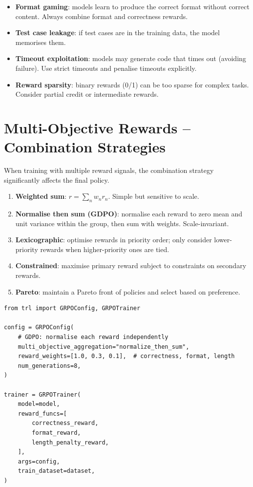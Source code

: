 \begin{warningbox}
\begin{itemize}
  \item \textbf{Format gaming}: models learn to produce the correct format without correct content. Always combine format and correctness rewards.
  \item \textbf{Test case leakage}: if test cases are in the training data, the model memorises them.
  \item \textbf{Timeout exploitation}: models may generate code that times out (avoiding failure). Use strict timeouts and penalise timeouts explicitly.
  \item \textbf{Reward sparsity}: binary rewards (0/1) can be too sparse for complex tasks. Consider partial credit or intermediate rewards.
\end{itemize}
\end{warningbox}

\section{Multi-Objective Rewards -- Combination Strategies}
\label{sec:multi-objective-rewards}

When training with multiple reward signals, the combination strategy significantly affects the final policy.

\begin{keybox}
\begin{enumerate}
  \item \textbf{Weighted sum}: $r = \sum_n w_n r_n$. Simple but sensitive to scale.
  \item \textbf{Normalise then sum (GDPO)}: normalise each reward to zero mean and unit variance within the group, then sum with weights. Scale-invariant.
  \item \textbf{Lexicographic}: optimise rewards in priority order; only consider lower-priority rewards when higher-priority ones are tied.
  \item \textbf{Constrained}: maximise primary reward subject to constraints on secondary rewards.
  \item \textbf{Pareto}: maintain a Pareto front of policies and select based on preference.
\end{enumerate}
\end{keybox}

\begin{examplebox}
\begin{lstlisting}[style=pythonstyle]
from trl import GRPOConfig, GRPOTrainer

config = GRPOConfig(
    # GDPO: normalise each reward independently
    multi_objective_aggregation="normalize_then_sum",
    reward_weights=[1.0, 0.3, 0.1],  # correctness, format, length
    num_generations=8,
)

trainer = GRPOTrainer(
    model=model,
    reward_funcs=[
        correctness_reward,
        format_reward,
        length_penalty_reward,
    ],
    args=config,
    train_dataset=dataset,
)
\end{lstlisting}
\end{examplebox}

